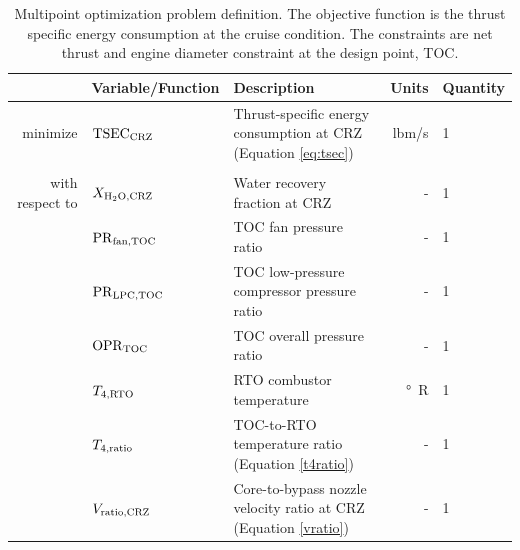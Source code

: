 \documentclass[conf]{new-aiaa}
\begin{document}
\begin{table}[hbt!]
    \centering
    \caption{
        Multipoint optimization problem definition.
        The objective function is the thrust specific energy consumption at the cruise condition.
        The constraints are net thrust and engine diameter constraint at the design point, TOC.
    }
    \small
    \renewcommand{\arraystretch}{1.2}
    \begin{tabular}{r l l r l}
        \toprule
                        & Variable/Function              & Description                                                           & Units          & Quantity \\
        \hline
        minimize        & $\rm{TSEC}_{\rm{CRZ}} $        & Thrust-specific energy consumption at CRZ (Equation \eqref{eq:tsec})  & \si{lbm/s}     & 1        \\
                        &                                &                                                                       &                &          \\
        with respect to & $X_{\rm{H_2O,CRZ}}$            & Water recovery fraction at CRZ                                        & -              & 1        \\
                        & $\rm{PR}_{\rm{fan,TOC}}$       & TOC fan pressure ratio                                                & -              & 1        \\
                        & $\rm{PR}_{\rm{LPC,TOC}}$       & TOC low-pressure compressor pressure ratio                            & -              & 1        \\
                        & $\rm{OPR}_{\rm{TOC}}$          & TOC overall pressure ratio                                            & -              & 1        \\
                        & $T_{4,\rm{RTO}}$               & RTO combustor temperature                                             & \si{\degree R} & 1        \\
                        & $T_{4,\rm{ratio}}$             & TOC-to-RTO temperature ratio (Equation \eqref{t4ratio})               & -              & 1        \\
                        & $V_{\rm{ratio,CRZ}}$           & Core-to-bypass nozzle velocity ratio at CRZ (Equation \eqref{vratio}) & -              & 1        \\

\end{tabular}
\end{table}
\end{document}
